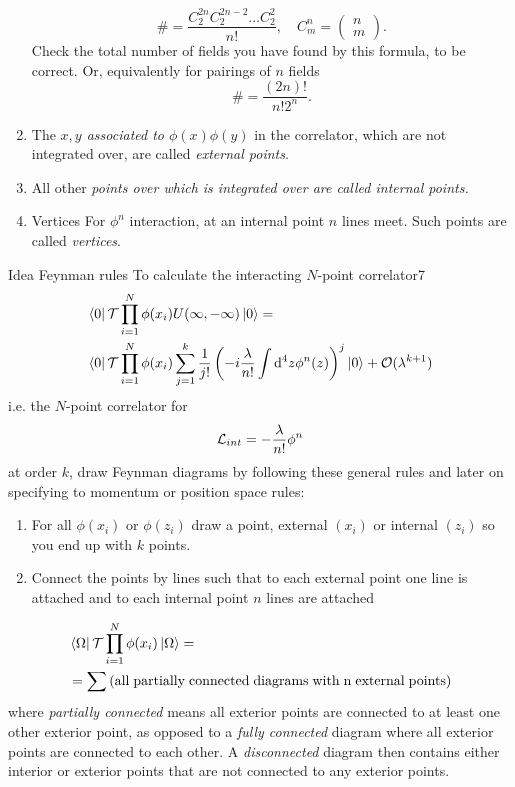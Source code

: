 \begin{enumerate}
\begin{equation}
	\#= \frac{C^{2n}_2 C^{2n-2}_2 \dots C^2_2}{n!}, \quad C^n_m=\begin{pmatrix}
	n\\
	m
	\end{pmatrix}.
\end{equation}
Check the total number of fields you have found by this formula, to be correct. Or, equivalently for pairings of $n$ fields
\begin{equation}
	\# = \frac{(2n)!}{n! 2^n}.
\end{equation}
\item The \emph{$x,y$ associated to $\phi(x)\phi(y)$} in the correlator, which are not integrated over, are called \emph{external points}.
\item All other \emph{points over which is integrated over are called internal points.}
\item  \begin{mybox}{Vertices}
	For $\phi^n$ interaction, at an internal point $n$ lines meet. Such points are called \emph{vertices}.
\end{mybox}
\end{enumerate}
\begin{mybox}{Idea Feynman rules}
	To calculate the interacting $N$-point correlator7
	\begin{align}
	&\bra{0}\mathcal{T}\prod_{i=1}^N \phi(x_i) U(\infty,-\infty)\ket{0}=\\
	&\bra{0}\mathcal{T}\prod_{i=1}^N \phi(x_i) \sum_{j=1}^{k} \frac{1}{j!} \left(-i \frac{\lambda}{n!} \int \mathrm{d}^4 z \phi^n(z)\right)^j \ket{0}+\mathcal{O}(\lambda^{k+1})\nonumber
	\end{align}
i.e. the $N$-point correlator for \begin{equation}
\mathcal{L}_{int} = - \frac{\lambda}{n!} \phi^n
\end{equation}
at order $k$, draw Feynman diagrams by following these general rules and later on specifying to momentum or position space rules:
\begin{enumerate}
\item For all $\phi(x_i)$ or $\phi(z_i)$ draw a point, external $(x_i)$ or internal $(z_i)$ so you end up with $k$ points.
\item Connect the points by lines such that to each external point one line is attached and to each internal point $n$ lines are attached
\end{enumerate}
\begin{align*}
	&\bra{\Omega}\mathcal{T}\prod_{i=1}^{N} \phi(x_i) \ket{\Omega}=\\
	&=\sum \left(\mathrm{all\;partially\;connected\;diagrams\;with\;n\;external\;points}\right)
\end{align*}
where \emph{partially connected} means all exterior points are connected to at least one other exterior point, as opposed to a \emph{fully connected} diagram where all exterior points are connected to each other. A \emph{disconnected} diagram then contains either interior or exterior points that are not connected to any exterior points.
\end{mybox}

